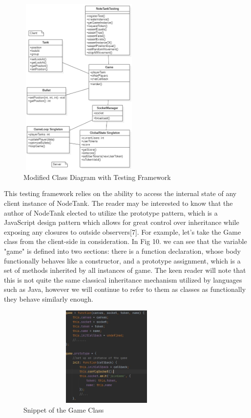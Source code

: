 \documentclass[conference]{IEEEtran}
\begin{document}
\begin{figure}[htbp]
\centerline{\includegraphics [width = 6cm, height = 9cm] {Class2.0.PNG}}
\caption{Modified Class Diagram with Testing Framework}
\end{figure}

This testing framework relies on the ability to access the internal state of any client instance of NodeTank. The reader may be interested to know that the author of NodeTank 
elected to utilize the prototype pattern, which is a JavaScript design pattern which allows for great control over inheritance while exposing any closures to outside observers[7]. For example, 
let's take the Game class from the client-side in consideration. In Fig 10. we can see that the variable "game" is defined into two sections: there is a function declaration, whose body functionally 
behaves like a constructor, and a prototype assignment, which is a set of methods inherited by all instances of game. The keen reader will note that this is not quite the same classical inheritance
mechanism utilized by languages such as Java, however we will continue to refer to them as classes as functionally they behave similarly enough.

\begin{figure}[htbp]
\centerline{\includegraphics [width = 9cm, height = 5cm] {GameCodeSnippet.jpg}}
\caption{Snippet of the Game Class}
\end{figure}
\end{document}
